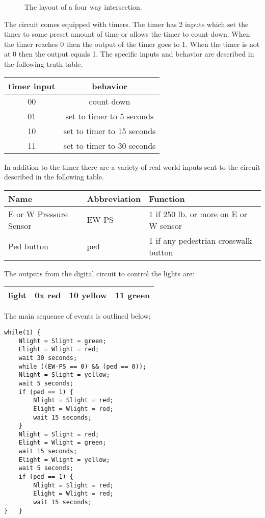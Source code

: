 \begin{enumerate}
        \begin{figure}[ht]
            \caption{The layout of a four way intersection.}
            \label{fig:crossroad}
        \end{figure}

        The circuit comes equipped with timers.
        The timer has 2 inputs which set the timer to some preset
        amount of time or allows the timer to count down.  When the
        timer reaches 0 then the output of the timer goes to 1.
        When the timer is not at 0 then the output equals 1.
        The specific inputs and behavior are described in the following
        truth table.

        \begin{tabular}{|c|c|} \hline
            timer input & behavior          \\ \hline \hline
            00 & count down                 \\ \hline
            01 & set to timer to 5  seconds \\ \hline
            10 & set to timer to 15 seconds \\ \hline
            11 & set to timer to 30 seconds \\ \hline
        \end{tabular}

        In addition to the timer there are a variety of real world inputs
        sent to the circuit described in the following table.

        \begin{tabular}{|l|l|l|} \hline
            Name                    & Abbreviation & Function \\                       \hline \hline
            E or W Pressure Sensor  & EW-PS & 1 if 250 lb. or more on E or W sensor \\ \hline
            Ped button              & ped   & 1 if any pedestrian crosswalk button  \\ \hline
        \end{tabular}

        The outputs from the digital circuit to control the lights are:

        \begin{tabular}{|l|l|l|l|} \hline
            light           & 0x red &  10 yellow & 11 green \\ \hline
        \end{tabular}

        The main sequence of events is outlined below;
\begin{verbatim}
while(1) {
    Nlight = Slight = green;
    Elight = Wlight = red;
    wait 30 seconds;
    while ((EW-PS == 0) && (ped == 0));
    Nlight = Slight = yellow;
    wait 5 seconds;
    if (ped == 1) {
        Nlight = Slight = red;
        Elight = Wlight = red;
        wait 15 seconds;
    }
    Nlight = Slight = red;
    Elight = Wlight = green;
    wait 15 seconds;
    Elight = Wlight = yellow;
    wait 5 seconds;
    if (ped == 1) {
        Nlight = Slight = red;
        Elight = Wlight = red;
        wait 15 seconds;
}   }
\end{verbatim}


\end{enumerate}
